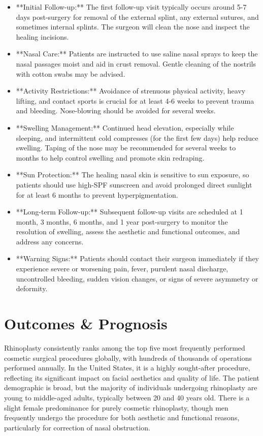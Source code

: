 \begin{itemize}
  \item **Initial Follow-up:** The first follow-up visit typically occurs around 5-7 days post-surgery for removal of the external splint, any external sutures, and sometimes internal splints. The surgeon will clean the nose and inspect the healing incisions.
  
  \item **Nasal Care:** Patients are instructed to use saline nasal sprays to keep the nasal passages moist and aid in crust removal. Gentle cleaning of the nostrils with cotton swabs may be advised.
  
  \item **Activity Restrictions:** Avoidance of strenuous physical activity, heavy lifting, and contact sports is crucial for at least 4-6 weeks to prevent trauma and bleeding. Nose-blowing should be avoided for several weeks.
  
  \item **Swelling Management:** Continued head elevation, especially while sleeping, and intermittent cold compresses (for the first few days) help reduce swelling. Taping of the nose may be recommended for several weeks to months to help control swelling and promote skin redraping.
  
  \item **Sun Protection:** The healing nasal skin is sensitive to sun exposure, so patients should use high-SPF sunscreen and avoid prolonged direct sunlight for at least 6 months to prevent hyperpigmentation.
  
  \item **Long-term Follow-up:** Subsequent follow-up visits are scheduled at 1 month, 3 months, 6 months, and 1 year post-surgery to monitor the resolution of swelling, assess the aesthetic and functional outcomes, and address any concerns.
  
  \item **Warning Signs:** Patients should contact their surgeon immediately if they experience severe or worsening pain, fever, purulent nasal discharge, uncontrolled bleeding, sudden vision changes, or signs of severe asymmetry or deformity.
\end{itemize}

\section*{Outcomes \& Prognosis}
Rhinoplasty consistently ranks among the top five most frequently performed cosmetic surgical procedures globally, with hundreds of thousands of operations performed annually. In the United States, it is a highly sought-after procedure, reflecting its significant impact on facial aesthetics and quality of life. The patient demographic is broad, but the majority of individuals undergoing rhinoplasty are young to middle-aged adults, typically between 20 and 40 years old. There is a slight female predominance for purely cosmetic rhinoplasty, though men frequently undergo the procedure for both aesthetic and functional reasons, particularly for correction of nasal obstruction.

